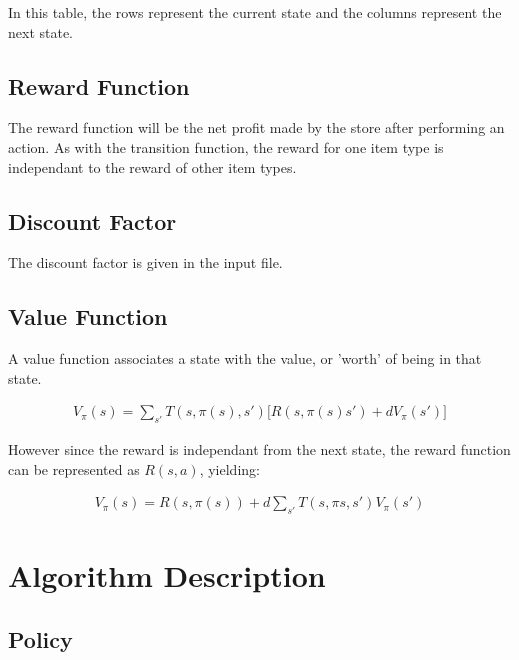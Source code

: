 \documentclass[12pt]{article}
\begin{document}
    In this table, the rows represent the current state and the columns represent the next state.

    \subsection{Reward Function}

    The reward function will be the net profit made by the store after performing an action. As with the transition function, the reward for one item type is independant to the reward of other item types.

    \subsection{Discount Factor}

    The discount factor is given in the input file.

    \subsection{Value Function}

    A value function associates a state with the value, or 'worth' of being in that state.

    \begin{align*}
        V_{\pi}(s) = \sum_{s'} T(s, \pi(s), s') \big[ R(s, \pi(s) s') + dV_{\pi}(s') \big]
    \end{align*}

    However since the reward is independant from the next state, the reward function can be represented as $R(s, a)$, yielding:

    \begin{align*}
        V_{\pi}(s) = R(s, \pi(s)) + d\sum_{s'}T(s, \pi{s}, s') V_{\pi}(s')
    \end{align*}

    \section{Algorithm Description}

    \subsection{Policy}
\end{document}
